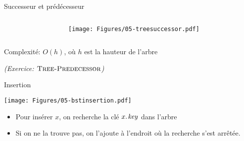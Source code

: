 \begin{frame}{Successeur et prédécesseur}

\begin{columns}
\begin{column}{5cm}
\begin{center}
\begin{small}
\end{small}
\end{center}
\end{column}
\begin{column}{5cm}
\begin{center}

  \bigskip

\bigskip

\texttt{[image: Figures/05-treesuccessor.pdf]}
\end{center}
\end{column}
\end{columns}

\bigskip

Complexité: $O(h)$, où $h$ est la hauteur de l'arbre

\bigskip

\emph{(Exercice: $\textnormal{\scshape Tree-Predecessor}$)}


\end{frame}

\begin{frame}{Insertion}

\begin{center}
\texttt{[image: Figures/05-bstinsertion.pdf]}
\end{center}

\begin{itemize}
\item Pour insérer $x$, on recherche la clé $\attrib{x}{key}$ dans l'arbre
\item Si on ne la trouve pas, on l'ajoute à l'endroit où la recherche s'est arrêtée.
\end{itemize}
\end{frame}

